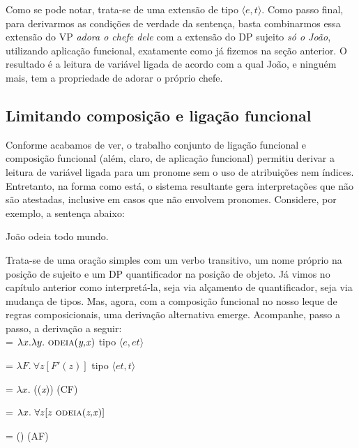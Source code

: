 \bigskip

\n Como se pode notar, trata-se de uma extensão de tipo $\langle e,t\rangle$. Como passo final, para derivarmos as condições de verdade da sentença, basta combinarmos essa extensão do VP \textit{adora o chefe dele} com a extensão do DP sujeito \textit{só o João}, utilizando aplicação funcional, exatamente como já fizemos na seção anterior. O resultado é a leitura de variável ligada de acordo com a qual João, e ninguém mais, tem a propriedade de adorar o próprio chefe.

\subsection{Limitando composição e ligação funcional}

Conforme acabamos de ver, o trabalho conjunto de ligação funcional e composição funcional (além, claro, de aplicação funcional) permitiu derivar a leitura de variável ligada para um pronome sem o uso de atribuições nem índices. Entretanto, na forma como está, o sistema resultante gera interpretações que não são atestadas, inclusive em casos que não envolvem pronomes. Considere, por exemplo, a sentença abaixo:

\begin{exe}
	\ex João odeia todo mundo. \label{err}
\end{exe}

Trata-se de uma oração simples com um verbo transitivo, um nome próprio na posição de sujeito e um DP quantificador na posição de objeto. Já vimos no capítulo anterior como interpretá-la, seja via alçamento de quantificador, seja via mudança de tipos. Mas, agora, com a composição funcional no nosso leque de regras composicionais, uma derivação alternativa emerge. Acompanhe, passo a passo, a derivação a seguir:\\

\n {} = $\lambda x. \lambda y.\ \predica{odeia}{y,x}$ \hfill tipo $\langle e,et \rangle$ 

\n {} = $\lambda F.\ \forall z [F'(z)]$ \hfill tipo $\langle et,t \rangle$

\n {} = $\lambda x.$ ((\textit{x})) \hfill (CF)

\n {} = $\lambda x.\ \forall z [z\ \predica{odeia}{z,x}]$ 

\n {} = () \hfill (AF)


